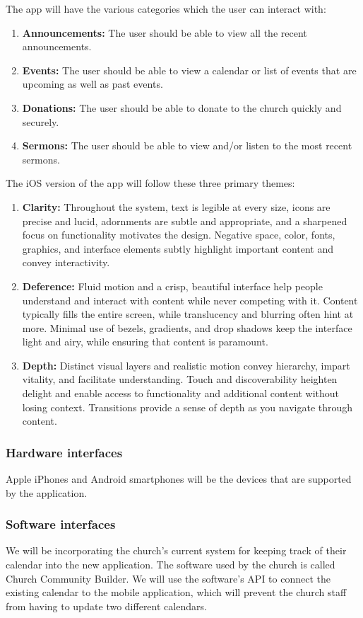 \documentclass[letterpaper,10pt,draftclsnofoot,onecolumn,compsoc,titlepage]{IEEEtran}
\begin{document}
	The app will have the various categories which the user can interact with:
	\begin{enumerate}
		\item \textbf{Announcements:} The user should be able to view all the recent announcements.
		\item \textbf{Events:} The user should be able to view a calendar or list of events that are upcoming as well as past events.
		\item \textbf{Donations:} The user should be able to donate to the church quickly and securely.
		\item \textbf{Sermons:} The user should be able to view and/or listen to the most recent sermons.
	\end{enumerate}

	The iOS version of the app will follow these three primary themes:
	\begin{enumerate}
		\item \textbf{Clarity:} Throughout the system, text is legible at every size, icons are precise and lucid, adornments are subtle and appropriate, and a sharpened focus on functionality motivates the design.
		Negative space, color, fonts, graphics, and interface elements subtly highlight important content and convey interactivity.
		\item \textbf{Deference:} Fluid motion and a crisp, beautiful interface help people understand and interact with content while never competing with it.
		Content typically fills the entire screen, while translucency and blurring often hint at more.
		Minimal use of bezels, gradients, and drop shadows keep the interface light and airy, while ensuring that content is paramount.
		\item \textbf{Depth:} Distinct visual layers and realistic motion convey hierarchy, impart vitality, and facilitate understanding.
		Touch and discoverability heighten delight and enable access to functionality and additional content without losing context.
		Transitions provide a sense of depth as you navigate through content.
	\end{enumerate}

	\subsubsection{Hardware interfaces}
	Apple iPhones and Android smartphones will be the devices that are supported by the application.

	\subsubsection{Software interfaces}
	We will be incorporating the church's current system for keeping track of their calendar into the new application.
	The software used by the church is called Church Community Builder.
	We will use the software's API to connect the existing calendar to the mobile application, which will prevent the church staff from having to update two different calendars.
\end{document}
